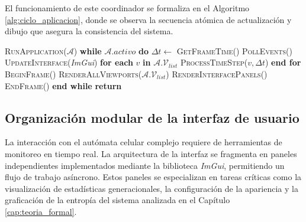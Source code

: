 El funcionamiento de este coordinador se formaliza en el Algoritmo \ref{alg:ciclo_aplicacion}, donde se observa la secuencia atómica de actualización y dibujo que asegura la consistencia del sistema.

\begin{algorithm}[H]
\caption{Bucle principal de orquestación del simulador.}\label{alg:ciclo_aplicacion}
\begin{algorithmic}
\STATE 
\STATE \textsc{RunApplication}($\mathcal{A}$)
\STATE \hspace{0.5cm}\textbf{while} $\mathcal{A}.activo$ \textbf{do}
\STATE \hspace{1.0cm}$ \Delta t \gets $ \textsc{GetFrameTime}()
\STATE \hspace{1.0cm}\textsc{PollEvents}()
\STATE \hspace{1.0cm}\textsc{UpdateInterface}(\textit{ImGui})
\STATE \hspace{1.0cm}\textbf{for each} $v$ \textbf{ in } $\mathcal{A}.\mathcal{V}_{list}$
\STATE \hspace{1.5cm}\textsc{ProcessTimeStep}($v, \Delta t$)
\STATE \hspace{1.0cm}\textbf{end for}
\STATE \hspace{1.0cm}\textsc{BeginFrame}()
\STATE \hspace{1.5cm}\textsc{RenderAllViewports}($\mathcal{A}.\mathcal{V}_{list}$)
\STATE \hspace{1.5cm}\textsc{RenderInterfacePanels}()
\STATE \hspace{1.0cm}\textsc{EndFrame}()
\STATE \hspace{0.5cm}\textbf{end while}
\STATE \textbf{return}
\end{algorithmic}
\end{algorithm}

\subsection{Organización modular de la interfaz de usuario}

La interacción con el autómata celular complejo requiere de herramientas de monitoreo en tiempo real. La arquitectura de la interfaz se fragmenta en paneles independientes implementados mediante la biblioteca \textit{ImGui}, permitiendo un flujo de trabajo asíncrono. Estos paneles se especializan en tareas críticas como la visualización de estadísticas generacionales, la configuración de la apariencia y la graficación de la entropía del sistema analizada en el Capítulo \ref{cap:teoria_formal}.


